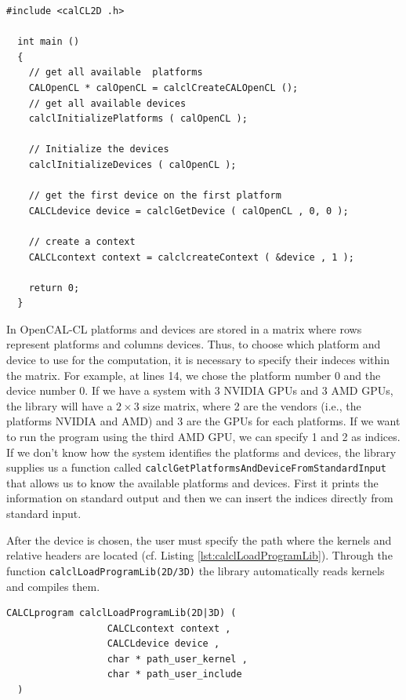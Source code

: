 \begin{lstlisting}[float,floatplacement=H, label=lst:CALOpenCL, caption=Access to platform and devices.]
  #include <calCL2D .h>

  int main ()
  {
    // get all available  platforms
    CALOpenCL * calOpenCL = calclCreateCALOpenCL ();
    // get all available devices
    calclInitializePlatforms ( calOpenCL );

    // Initialize the devices
    calclInitializeDevices ( calOpenCL );

    // get the first device on the first platform
    CALCLdevice device = calclGetDevice ( calOpenCL , 0, 0 );

    // create a context
    CALCLcontext context = calclcreateContext ( &device , 1 );

    return 0;
  }
\end{lstlisting}

In OpenCAL-CL platforms and devices are stored in a matrix where rows
represent platforms and columns devices. Thus, to choose which
platform and device to use for the computation, it is necessary to
specify their indeces within the matrix. For example, at lines 14, we
chose the platform number 0 and the device number 0. If we have a
system with 3 NVIDIA GPUs and 3 AMD GPUs, the library will have a $2
\times 3$ size matrix, where 2 are the vendors (i.e., the platforms
NVIDIA and AMD) and 3 are the GPUs for each platforms. If we want to
run the program using the third AMD GPU, we can specify 1 and 2 as
indices. If we don't know how the system identifies the platforms and
devices, the library supplies us a function called
\verb'calclGetPlatformsAndDeviceFromStandardInput' that allows us to
know the available platforms and devices. First it prints the
information on standard output and then we can insert the indices
directly from standard input.

After the device is chosen, the user must specify the path where the
kernels and relative headers are located (cf. Listing
\ref{lst:calclLoadProgramLib}). Through the function
\verb'calclLoadProgramLib(2D/3D)' the library automatically reads
kernels and compiles them.

\begin{lstlisting}[float,floatplacement=H, label=lst:calclLoadProgramLib, caption=The calclLoadProgramLib function., numbers=none]
  CALCLprogram calclLoadProgramLib(2D|3D) (
                  CALCLcontext context ,
                  CALCLdevice device ,
                  char * path_user_kernel ,
                  char * path_user_include
  )
\end{lstlisting}

